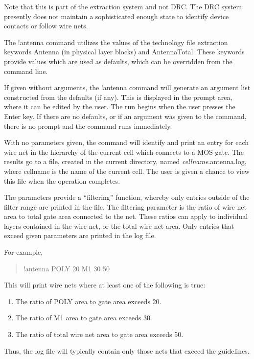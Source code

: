 Note that this is part of the extraction system and not DRC.  The DRC
system presently does not maintain a sophisticated enough state to
identify device contacts or follow wire nets.

The {\cb !antenna} command utilizes the values of the technology file
extraction keywords {\et Antenna} (in physical layer blocks) and {\et
AntennaTotal}.  These keywords provide values which are used as
defaults, which can be overridden from the command line.

If given without arguments, the {\cb !antenna} command will generate
an argument list constructed from the defaults (if any).  This is
displayed in the prompt area, where it can be edited by the user.  The
run begins when the user presses the {\kb Enter} key.  If there are no
defaults, or if an argument was given to the command, there is no
prompt and the command runs immediately.

With no parameters given, the command will identify and print an entry
for each wire net in the hierarchy of the current cell which connects
to a MOS gate.  The results go to a file, created in the current
directory, named {\it cellname\/}{\vt .antenna.log}, where {\vt
cellname} is the name of the current cell.  The user is given a chance
to view this file when the operation completes.

The parameters provide a ``filtering'' function, whereby only entries
outside of the filter range are printed in the file.  The filtering
parameter is the ratio of wire net area to total gate area connected
to the net.  These ratios can apply to individual layers contained in
the wire net, or the total wire net area.  Only entries that exceed
given parameters are printed in the log file.
 
For example,
\begin{quote}
\vt !antenna POLY 20 M1 30 50
\end{quote}

This will print wire nets where at least one of the following is
true:
\begin{enumerate}
\item{The ratio of POLY area to gate area exceeds 20.}
\item{The ratio of M1 area to gate area exceeds 30.}
\item{The ratio of total wire net area to gate area exceeds 50.}
\end{enumerate}

Thus, the log file will typically contain only those nets that exceed
the guidelines.


